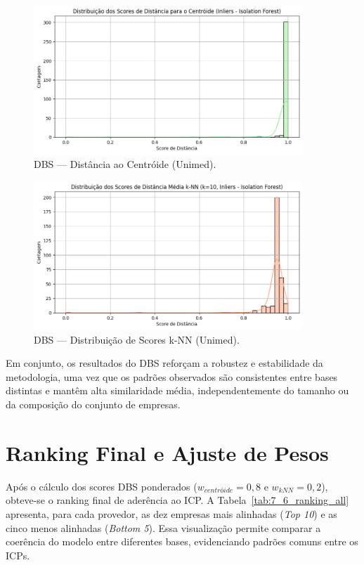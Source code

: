 \begin{figure}[H]
    \centering
    \includegraphics[width=0.9\textwidth]{imagens/unimed_centroid.png}
    \caption{DBS — Distância ao Centróide (Unimed).}
    \label{fig:unimed_centroid}
\end{figure}

\begin{figure}[H]
    \centering
    \includegraphics[width=0.9\textwidth]{imagens/unimed_knn.png}
    \caption{DBS — Distribuição de Scores k-NN (Unimed).}
    \label{fig:unimed_knn}
\end{figure}

Em conjunto, os resultados do DBS reforçam a robustez e estabilidade da metodologia, uma vez que os padrões observados são consistentes entre bases distintas e mantêm alta similaridade média, independentemente do tamanho ou da composição do conjunto de empresas.

\section{Ranking Final e Ajuste de Pesos}

Após o cálculo dos scores DBS ponderados ($w_{centróide}=0{,}8$ e $w_{kNN}=0{,}2$), obteve-se o ranking final de aderência ao ICP. A Tabela~\ref{tab:7_6_ranking_all} apresenta, para cada provedor, as dez empresas mais alinhadas (\textit{Top 10}) e as cinco menos alinhadas (\textit{Bottom 5}). Essa visualização permite comparar a coerência do modelo entre diferentes bases, evidenciando padrões comuns entre os ICPs.


